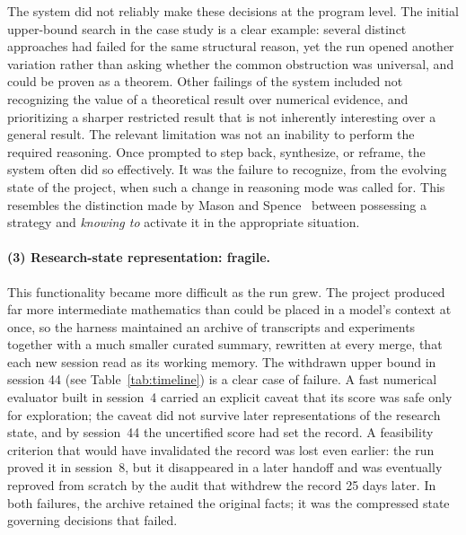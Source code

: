The system did not reliably make these decisions at the program level. The initial
upper-bound search in the case study is a clear example: several distinct approaches had
failed for the same structural reason, yet the run opened another variation
rather than asking whether the common obstruction was universal, and could be proven as a theorem. Other failings of the system included not recognizing the value of a theoretical result over numerical evidence, and prioritizing a sharper restricted result that is not inherently interesting over a general result. The relevant limitation was not an inability to perform the required
reasoning. Once prompted to step back, synthesize, or reframe, the system
often did so effectively. It was the failure to recognize, from the evolving
state of the project, when such a change in reasoning mode was called for.
This resembles the distinction made by Mason and Spence~\cite{mason1999beyond} between possessing a strategy and
\emph{knowing to} activate it in the appropriate situation. 




\paragraph{(3) Research-state representation: fragile.}


This functionality became more difficult as the run grew. The project produced
far more intermediate mathematics than could be placed in a model's context
at once, so the harness maintained an archive of transcripts and experiments
together with a much smaller curated summary, rewritten at every merge, that
each new session read as its working memory. The withdrawn upper bound in session 44 (see Table~\ref{tab:timeline}) is a
clear case of failure. A fast numerical evaluator built in session~4 carried
an explicit caveat that its score was safe only for exploration; the caveat
did not survive later representations of the research state, and by
session~44 the uncertified score had set the record.
A feasibility criterion that would have invalidated the record was lost even earlier: the run proved it in session~8, but it disappeared in a later handoff and was eventually reproved from scratch by the audit that withdrew the record 25 days later.
In both failures, the archive retained the original facts; it was the compressed state governing decisions that
failed.


